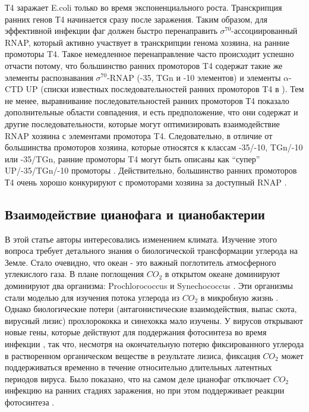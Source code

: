 \documentclass[14pt]{extarticle}
\begin{document}
        \par{Т4 заражает E.coli только во время экспоненциального роста. Транскрипция ранних генов Т4 начинается сразу 
        после заражения. Таким образом, для эффективной инфекции фаг должен быстро перенаправить 
        \(\sigma^{70}\)-ассоциированный RNAP, который активно участвует в транскрипции генома хозяина, на ранние 
        промоторы T4. Такое немедленное перенаправление часто происходит успешно отчасти потому, что большинство ранних 
        промоторов T4 содержат такие же элементы распознавания \(\sigma^{70}\)-RNAP (-35, TGn и -10 элементов) и 
        элементы \(\alpha\)-CTD UP (списки известных последовательностей ранних промоторов T4 в \cite{4}). Тем не
        менее, выравнивание последовательностей ранних промоторов Т4 показало дополнительные области совпадения, и есть 
        предположение, что они содержат и другие последовательности, которые могут оптимизировать взаимодействие RNAP 
        хозяина с элементами промотора T4. Следовательно, в отличие от большинства промоторов хозяина, которые относятся
        к классам -35/-10, TGn/-10 или -35/TGn, ранние промоторы T4 могут быть описаны как ``супер'' UP/-35/TGn/-10 
        промоторы \cite{hinton}. Действительно, большинство ранних промоторов Т4 очень хорошо конкурируют с промоторами 
        хозяина за доступный RNAP \cite{39}.}
        
\begin{center}
    \item \subsection{Взаимодействие цианофага и цианобактерии}
\end{center}
    
    \par{В этой статье авторы интересовались изменением климата. Изучение этого вопроса требует детального знания о
    биологической трансформации углерода на Земле. Стало очевидно, что океан - это важный поглотитель
    атмосферного углекислого газа. В плане поглощения $CO_2$ в открытом океане доминируют доминируют два организма: 
    Prochlorococcus и Synechococcus \cite{3_,4_}. Эти организмы стали моделью для изучения потока углерода из $CO_2$ 
    в микробную жизнь \cite{5_}. Однако биологические потери (антагонистические взаимодействия, выпас скота, вирусный
    лизис) прохлорококка и синехокка мало изучены. У вирусов открывают новые гены, которые действуют для 
    поддержания фотосинтеза во время инфекции \cite{8_}, так что, несмотря на окончательную потерю фиксированного 
    углерода в растворенном органическом веществе в результате лизиса, фиксация $CO_2$ может поддерживаться временно в 
    течение относительно длительных латентных периодов вируса. Было показано, что на самом деле цианофаг 
    отключает $CO_2$ инфекцию на ранних стадиях заражения, но при этом поддерживает реакции фотосинтеза \cite{9_}.}
    
\end{document}
